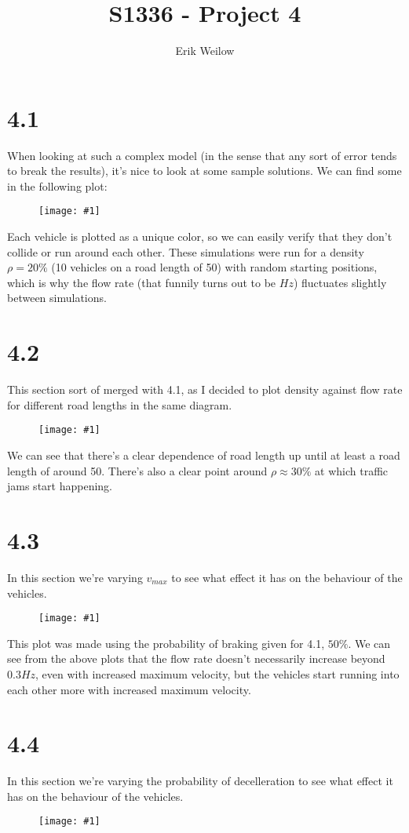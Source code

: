 \documentclass[11pt]{article}
\title{S1336 - Project 4}
\author{Erik Weilow}
\newcommand{\singlewiderfigure}[1]{
\begin{figure}[H]
  \centering
  \begin{minipage}{0.6\textwidth}
    \centering
    \texttt{[image: \#1]}
  \end{minipage}
\end{figure}
}
\begin{document}
\maketitle
\newpage

\section*{4.1}
When looking at such a complex model (in the sense that any sort of error tends to break the results), it's nice to look at some sample solutions.
We can find some in the following plot:
\singlewiderfigure{./plots/4_1/sim1.png}
Each vehicle is plotted as a unique color, so we can easily verify that they don't collide or run around each other.
These simulations were run for a density $\rho = 20\%$ (10 vehicles on a road length of 50) with random starting positions, which is why the flow rate (that funnily turns out to be $Hz$) fluctuates slightly between simulations.

\section*{4.2}
This section sort of merged with 4.1, as I decided to plot density against flow rate for different road lengths in the same diagram.
\singlewiderfigure{./plots/4_2/density.png}

We can see that there's a clear dependence of road length up until at least a road length of around 50. There's also a clear point around $\rho \approx 30\%$ at which traffic jams start happening.

\section*{4.3}
In this section we're varying $v_{max}$ to see what effect it has on the behaviour of the vehicles.
\singlewiderfigure{./plots/4_3/sim1.png}

This plot was made using the probability of braking given for 4.1, $50\%$.
We can see from the above plots that the flow rate doesn't necessarily increase beyond $0.3 Hz$, even with increased maximum velocity, but the vehicles start running into each other more with increased maximum velocity.

\section*{4.4}
In this section we're varying the probability of decelleration to see what effect it has on the behaviour of the vehicles.
\singlewiderfigure{./plots/4_4/sim1.png}
\end{document}
